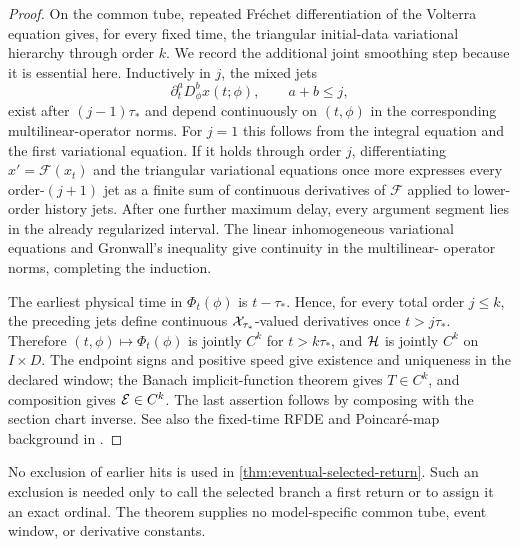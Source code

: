 \begin{proof}
On the common tube, repeated Fr\'echet differentiation of the Volterra
equation gives, for every fixed time, the triangular initial-data
variational hierarchy through order \(k\).  We record the additional joint
smoothing step because it is essential here.  Inductively in \(j\), the
mixed jets
\[
 \partial_t^aD_\phi^b x(t;\phi),
 \qquad a+b\le j,
\]
exist after \((j-1)\tau_*\) and depend continuously on \((t,\phi)\) in the
corresponding multilinear-operator norms.  For \(j=1\) this follows from the
integral equation and the first variational equation.  If it holds through
order \(j\), differentiating \(x'=\mathcal F(x_t)\) and the triangular
variational equations once more expresses every order-\((j+1)\) jet as a
finite sum of continuous derivatives of \(\mathcal F\) applied to lower-order
history jets.  After one further maximum delay, every argument segment lies
in the already regularized interval.  The linear inhomogeneous variational
equations and Gronwall's inequality give continuity in the multilinear-
operator norms, completing the induction.

The earliest physical time in \(\Phi_t(\phi)\) is \(t-\tau_*\).  Hence, for
every total order \(j\le k\), the preceding jets define continuous
\(\mathcal X_{\tau_*}\)-valued derivatives once \(t>j\tau_*\).  Therefore
\((t,\phi)\mapsto\Phi_t(\phi)\) is jointly \(C^k\) for \(t>k\tau_*\), and
\(\mathcal H\) is jointly \(C^k\) on \(I\times D\).  The endpoint signs and
positive speed give existence and uniqueness in the declared window; the
Banach implicit-function theorem gives \(T\in C^k\), and composition gives
\(\mathcal E\in C^k\).  The last assertion follows by composing with the section
chart inverse.  See also the fixed-time RFDE and Poincar\'e-map background in
\citet[Chs.~VII.4 and XIV.3]{diekmann1995delay}.
\end{proof}

\begin{remark}
No exclusion of earlier hits is used in
\cref{thm:eventual-selected-return}.  Such an exclusion is needed only to
call the selected branch a first return or to assign it an exact ordinal.
The theorem supplies no model-specific common tube, event window, or
derivative constants.
\end{remark}
